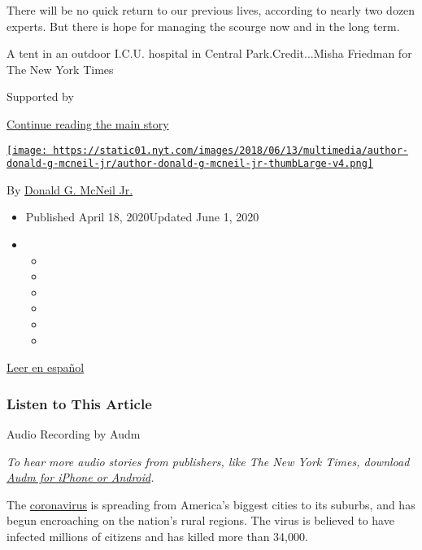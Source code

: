 There will be no quick return to our previous lives, according to nearly
two dozen experts. But there is hope for managing the scourge now and in
the long term.

A tent in an outdoor I.C.U. hospital in Central Park.Credit...Misha
Friedman for The New York Times

Supported by

\protect\hyperlink{after-sponsor}{Continue reading the main story}

\href{https://www.nytimes.com/by/donald-g-mcneil-jr}{\texttt{[image: https://static01.nyt.com/images/2018/06/13/multimedia/author-donald-g-mcneil-jr/author-donald-g-mcneil-jr-thumbLarge-v4.png]}}

By \href{https://www.nytimes.com/by/donald-g-mcneil-jr}{Donald G. McNeil
Jr.}

\begin{itemize}
\item
  Published April 18, 2020Updated June 1, 2020
\item
  \begin{itemize}
  \item
  \item
  \item
  \item
  \item
  \item
  \end{itemize}
\end{itemize}

\href{https://www.nytimes.com/es/2020/04/21/espanol/ciencia-y-tecnologia/coronavirus-futuro.html}{Leer
en español}

\hypertarget{listen-to-this-article}{%
\subsubsection{Listen to This Article}\label{listen-to-this-article}}

Audio Recording by Audm

\emph{To hear more audio stories from publishers, like The New York
Times, download}
\href{https://www.audm.com/?utm_source=nyt\&utm_medium=embed\&utm_campaign=coronavirus_year_ahead}{\emph{Audm
for iPhone or Android}}\emph{.}

The
\href{https://www.nytimes.com/2020/06/01/nyregion/nyc-coronavirus-flatbush-brooklyn.html}{coronavirus}
is spreading from America's biggest cities to its suburbs, and has begun
encroaching on the nation's rural regions. The virus is believed to have
infected millions of citizens and has killed more than 34,000.


